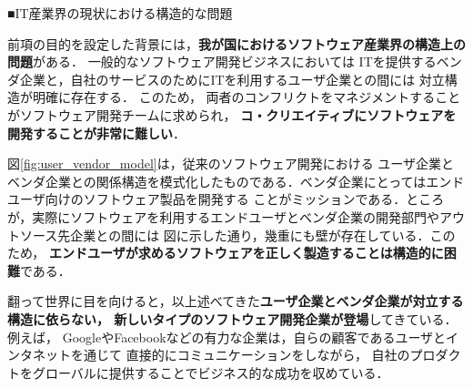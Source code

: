 \documentclass[11pt,a4paper,twoside]{jarticle}
\newcommand{\研究種別}{B}	%
\newcommand{\研究課題名}{コ・クリエイティブなソフトウェア開発者を育成するPBL型教育}
\newcommand{\研究機関名}{産業技術大学院大学}
\newcommand{\研究代表者氏名}{中鉢　欣秀}
\newcommand{\研究代表者氏名ふりがな}{ちゅうばち　よしひで}
\newcommand{\本応募effort}{\KLEffort{18}}	%
\newcommand{\研究期間の最終元号年度}{27}	%
\begin{document}
{	\begin{flushleft}
		■IT産業界の現状における構造的な問題
	\end{flushleft}

    前項の目的を設定した背景には，{\bf 我が国におけるソフトウェア産業界の構造上の問題}がある．
	一般的なソフトウェア開発ビジネスにおいては    
    ITを提供するベンダ企業と，自社のサービスのためにITを利用するユーザ企業との間には
    対立構造が明確に存在する．
    このため，
    両者のコンフリクトをマネジメントすることがソフトウェア開発チームに求められ，
    {\bf コ・クリエイティブにソフトウェアを開発することが非常に難しい}．
    
    図\ref{fig:user_vendor_model}は，従来のソフトウェア開発における
    ユーザ企業とベンダ企業との関係構造を模式化したものである．ベンダ企業にとってはエンドユーザ向けのソフトウェア製品を開発する
    ことがミッションである．ところが，実際にソフトウェアを利用するエンドユーザとベンダ企業の開発部門やアウトソース先企業との間には
    図に示した通り，幾重にも壁が存在している．このため，
    {\bf エンドユーザが求めるソフトウェアを正しく製造することは構造的に困難}である．
    
    
    
    

    翻って世界に目を向けると，以上述べてきた{\bf ユーザ企業とベンダ企業が対立する構造に依らない，
    新しいタイプのソフトウェア開発企業が登場}してきている．例えば，
    GoogleやFacebookなどの有力な企業は，自らの顧客であるユーザとインタネットを通じて
    直接的にコミュニケーションをしながら，
    自社のプロダクトをグローバルに提供することでビジネス的な成功を収めている．
    
}
\end{document}
